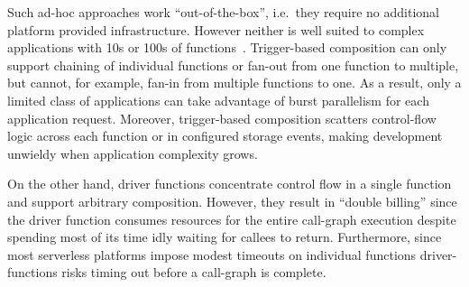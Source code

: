 %







Such ad-hoc approaches work ``out-of-the-box'', i.e.\ they require no
additional platform provided infrastructure. However neither is well suited to
complex applications with 10s or 100s of functions~\cite{excamera,
hello-retail}. Trigger-based composition can only support chaining of
individual functions or fan-out from one function to multiple, but cannot, for
example, fan-in from multiple functions to one. As a result, only a limited
class of applications can take advantage of burst parallelism for each
application request. Moreover, trigger-based composition scatters control-flow
logic across each function or in configured storage events, making development
unwieldy when application complexity grows.

On the other hand, driver functions concentrate control flow in a single
function and support arbitrary composition. However, they result in ``double
billing'' since the driver function consumes resources for the entire call-graph
execution despite spending most of its time idly waiting for callees to return.
Furthermore, since most serverless platforms impose modest timeouts on
individual functions driver-functions risks timing out before a call-graph is
complete.

